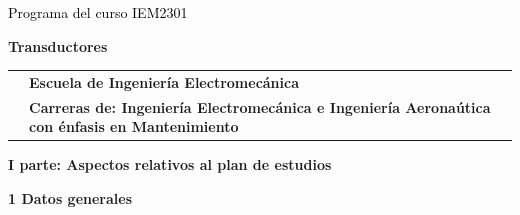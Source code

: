 \documentclass[letterpaper]{article}%
\begin{document}
%
\normalsize%
\thispagestyle{empty}%
%
\vspace*{150mm}%
\par\fontsize{14}{0}\selectfont \textcolor{black}{Programa del curso IEM2301}%
\par\fontsize{18}{25}\selectfont \textbf{\textcolor{azulsuaveTEC}{Transductores}}%
\begin{tabularx}{\textwidth}{m{}m{}}%
&\hspace*{0mm}\fontsize{12}{14}\selectfont \textbf{\textcolor{gris}{Escuela de Ingeniería Electromecánica}}\\%
[-4pt]%
&\hspace*{0mm}\fontsize{12}{14}\selectfont \textbf{\textcolor{gris}{Carreras de: Ingeniería Electromecánica e Ingeniería Aeronaútica con énfasis en Mantenimiento}}\\%
\end{tabularx}%
\newpage%
\pagestyle{headfoot}%
\par\fontsize{14}{0}\selectfont \textbf{\textcolor{parte}{I parte: Aspectos relativos al plan de estudios}}%
\par\hspace*{4mm}\fontsize{12}{20}\selectfont \textbf{\textcolor{parte}{1 Datos generales}}%
\end{document}
